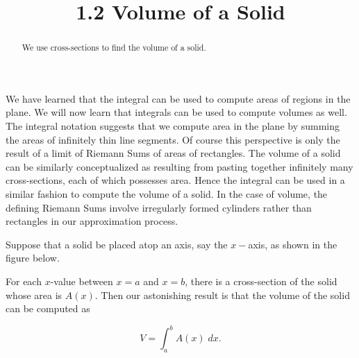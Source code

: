 \documentclass{ximera}
\title{1.2 Volume of a Solid}
\begin{document}
\begin{abstract}
We use cross-sections to find the volume of a solid.
\end{abstract}

\maketitle


We have learned that the integral can be used to compute areas of regions in the plane.  
We will now learn that integrals can be used to compute volumes as well.
The integral notation suggests that we compute area in the plane by summing the areas of  infinitely thin line segments.
Of course this perspective is only the result of a limit of Riemann Sums of areas of rectangles.
The volume of a solid can be similarly conceptualized as resulting from pasting together infinitely many cross-sections,
each of which possesses area. Hence the integral can be used in a similar fashion to compute the volume of a solid.
In the case of volume, the defining Riemann Sums involve irregularly formed cylinders rather than rectangles
in our approximation process.



Suppose that a solid be placed atop an axis, say the $x-$axis, as shown in the figure below.


For each $x$-value between $x = a$ and $x = b$,  there is a cross-section of the solid whose area is $A(x)$.
Then our astonishing result is that the volume of the solid can be computed as

\[
V = \int_a^b A(x) \; dx.
\]
\end{document}
